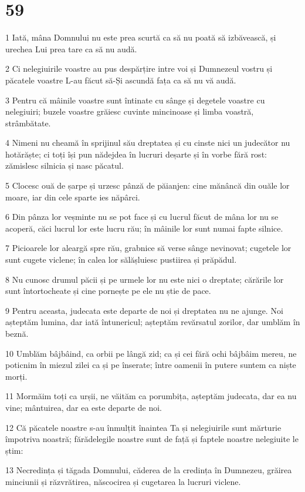 \chapter{59}

\par 1 Iată, mâna Domnului nu este prea scurtă ca să nu poată să izbăvească, și urechea Lui prea tare ca să nu audă.
\par 2 Ci nelegiuirile voastre au pus despărțire intre voi și Dumnezeul vostru și păcatele voastre L-au făcut să-Și ascundă fața ca să nu vă audă.
\par 3 Pentru că mâinile voastre sunt întinate cu sânge și degetele voastre cu nelegiuiri; buzele voastre grăiesc cuvinte mincinoase și limba voastră, strâmbătate.
\par 4 Nimeni nu cheamă în sprijinul său dreptatea și cu cinste nici un judecător nu hotărăște; ci toți își pun nădejdea în lucruri deșarte și în vorbe fără rost: zămislesc silnicia și nasc păcatul.
\par 5 Clocesc ouă de șarpe și urzesc pânză de păianjen: cine mănâncă din ouăle lor moare, iar din cele sparte ies năpârci.
\par 6 Din pânza lor veșminte nu se pot face și cu lucrul făcut de mâna lor nu se acoperă, căci lucrul lor este lucru rău; în mâinile lor sunt numai fapte silnice.
\par 7 Picioarele lor aleargă spre rău, grabnice să verse sânge nevinovat; cugetele lor sunt cugete viclene; în calea lor sălășluiesc pustiirea și prăpădul.
\par 8 Nu cunosc drumul păcii și pe urmele lor nu este nici o dreptate; cărările lor sunt întortocheate și cine pornește pe ele nu știe de pace.
\par 9 Pentru aceasta, judecata este departe de noi și dreptatea nu ne ajunge. Noi așteptăm lumina, dar iată întunericul; așteptăm revărsatul zorilor, dar umblăm în beznă.
\par 10 Umblăm bâjbâind, ca orbii pe lângă zid; ca și cei fără ochi bâjbâim mereu, ne poticnim în miezul zilei ca și pe înserate; între oamenii în putere suntem ca niște morți.
\par 11 Mormăim toți ca urșii, ne văităm ca porumbița, așteptăm judecata, dar ea nu vine; mântuirea, dar ea este departe de noi.
\par 12 Că păcatele noastre s-au înmulțit înaintea Ta și nelegiuirile sunt mărturie împotriva noastră; fărădelegile noastre sunt de față și faptele noastre nelegiuite le știm:
\par 13 Necredința și tăgada Domnului, căderea de la credința în Dumnezeu, grăirea minciunii și răzvrătirea, născocirea și cugetarea la lucruri viclene.
